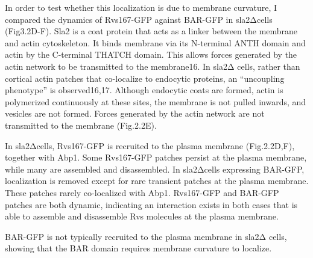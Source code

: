 	\vspace{5mm}
In order to test whether this localization is due to membrane curvature, I compared the dynamics of Rvs167-GFP against BAR-GFP in sla2Δcells (Fig3.2D-F). Sla2 is a coat protein that acts as a linker between the membrane and actin cytoskeleton. It binds membrane via its N-terminal ANTH domain and actin by the C-terminal THATCH domain. This allows forces generated by the actin network to be transmitted to the membrane16. In sla2Δ cells, rather than cortical actin patches that co-localize to endocytic proteins, an “uncoupling phenotype” is observed16,17. Although endocytic coats are formed, actin is polymerized continuously at these sites, the membrane is not pulled inwards, and vesicles are not formed. Forces generated by the actin network are not transmitted to the membrane (Fig.2.2E).

	\vspace{5mm}
In sla2Δcells, Rvs167-GFP is recruited to the plasma membrane (Fig.2.2D,F), together with Abp1. Some Rvs167-GFP patches persist at the plasma membrane, while many are assembled and disassembled. In sla2Δcells expressing BAR-GFP, localization is removed except for rare transient patches at the plasma membrane. These patches rarely co-localized with Abp1. Rvs167-GFP and BAR-GFP patches are both dynamic, indicating an interaction exists in both cases that is able to assemble and disassemble Rvs molecules at the plasma membrane. 

	\vspace{5mm}
BAR-GFP is not typically recruited to the plasma membrane in sla2Δ cells, showing that the BAR domain requires membrane curvature to localize. 



